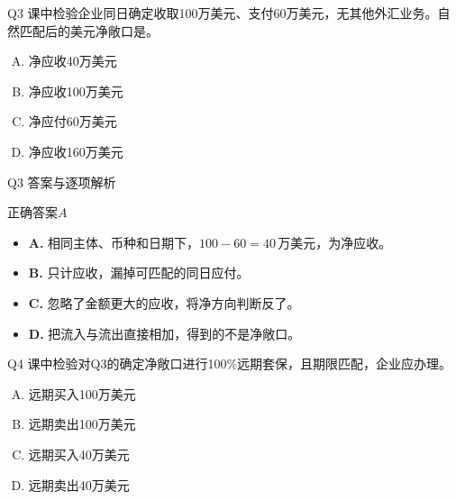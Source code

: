 \documentclass[aspectratio=169,compress,11pt]{beamer}
\newcommand{\currentweeklabel}{导入}
\begin{document}
\renewcommand{\currentweeklabel}{计量}\begin{frame}[t]{Q3 课中检验}\relax\hypertarget{slide7}{}\fontsize{10.5}{12.8}\selectfont\setlength{\abovedisplayskip}{.25em}\setlength{\belowdisplayskip}{.25em}企业同日确定收取100万美元、支付60万美元，无其他外汇业务。自然匹配后的美元净敞口是。\par\vspace{.7em}\begin{enumerate}[A.]\setlength{\itemsep}{.7em}\item 净应收40万美元\item 净应收100万美元\item 净应付60万美元\item 净应收160万美元\end{enumerate}\end{frame}
\renewcommand{\currentweeklabel}{计量}\begin{frame}[t]{Q3 答案与逐项解析}\relax\hypertarget{slide8}{}\fontsize{10.5}{12.8}\selectfont\setlength{\abovedisplayskip}{.25em}\setlength{\belowdisplayskip}{.25em}\begin{exampleblock}{正确答案}\(A\)\end{exampleblock}\begin{itemize}\setlength{\itemsep}{.4em}\item \textbf{A. }相同主体、币种和日期下，\(100-60=40\,\text{万美元}\)，为净应收。\item \textbf{B. }只计应收，漏掉可匹配的同日应付。\item \textbf{C. }忽略了金额更大的应收，将净方向判断反了。\item \textbf{D. }把流入与流出直接相加，得到的不是净敞口。\end{itemize}\end{frame}
\renewcommand{\currentweeklabel}{对冲}\begin{frame}[t]{Q4 课中检验}\relax\hypertarget{slide9}{}\fontsize{10.5}{12.8}\selectfont\setlength{\abovedisplayskip}{.25em}\setlength{\belowdisplayskip}{.25em}对Q3的确定净敞口进行100\%远期套保，且期限匹配，企业应办理。\par\vspace{.7em}\begin{enumerate}[A.]\setlength{\itemsep}{.7em}\item 远期买入100万美元\item 远期卖出100万美元\item 远期买入40万美元\item 远期卖出40万美元\end{enumerate}\end{frame}
\end{document}
